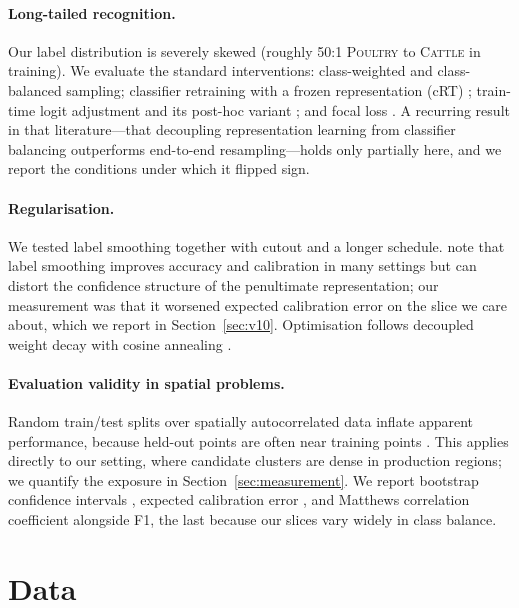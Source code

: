 \documentclass[11pt,a4paper]{article}
\begin{document}
\paragraph{Long-tailed recognition.}
Our label distribution is severely skewed (roughly 50:1 \textsc{Poultry} to
\textsc{Cattle} in training). We evaluate the standard interventions:
class-weighted and class-balanced sampling; classifier retraining with a frozen
representation (cRT) \citep{kang2020decoupling}; train-time logit adjustment
and its post-hoc variant \citep{menon2021logit}; and focal loss
\citep{lin2017focal}. A recurring result in that literature---that decoupling
representation learning from classifier balancing outperforms end-to-end
resampling---holds only partially here, and we report the conditions under
which it flipped sign.

\paragraph{Regularisation.}
We tested label smoothing \citep{szegedy2016rethinking} together with cutout
\citep{devries2017cutout} and a longer schedule. \citet{muller2019labelsmoothing}
note that label smoothing improves accuracy and calibration in many settings but
can distort the confidence structure of the penultimate representation; our
measurement was that it worsened expected calibration error on the slice we care
about, which we report in Section~\ref{sec:v10}. Optimisation follows decoupled
weight decay \citep{loshchilov2019adamw} with cosine annealing
\citep{loshchilov2017sgdr}.

\paragraph{Evaluation validity in spatial problems.}
Random train/test splits over spatially autocorrelated data inflate apparent
performance, because held-out points are often near training points
\citep{roberts2017spatialcv,ploton2020spatial}. This applies directly to our
setting, where candidate clusters are dense in production regions; we quantify
the exposure in Section~\ref{sec:measurement}. We report bootstrap confidence
intervals \citep{efron1987bootstrap}, expected calibration error
\citep{guo2017calibration}, and Matthews correlation coefficient
\citep{chicco2020mcc} alongside F1, the last because our slices vary widely in
class balance.

\section{Data}
\label{sec:data}
\end{document}
